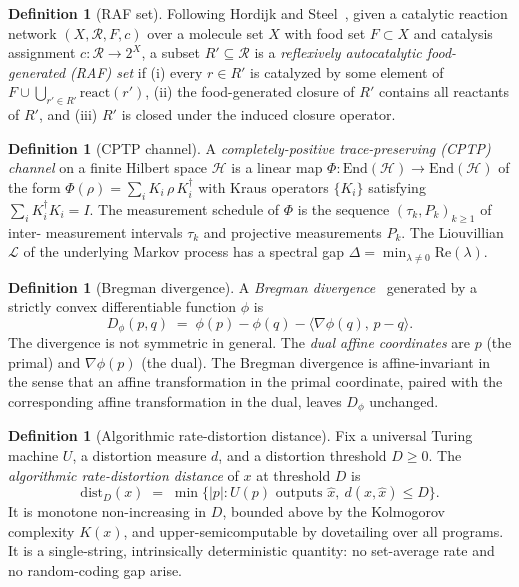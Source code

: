 \documentclass[11pt,a4paper]{article}
\theoremstyle{plain}
\theoremstyle{definition}
\newtheorem{definition}[theorem]{Definition}
\theoremstyle{remark}
\newcommand{\HH}{\mathcal{H}}
\newcommand{\End}{\mathrm{End}}
\newcommand{\distD}{\mathrm{dist}_{D}}
\begin{document}
\begin{definition}[RAF set]
\label{def:raf}
Following Hordijk and Steel~\cite{steel2004,hordijk2011}, given a
catalytic reaction network $(X, \mathcal{R}, F, c)$ over a molecule set
$X$ with food set $F\subset X$ and catalysis assignment $c:\mathcal{R}
\to 2^X$, a subset $R'\subseteq\mathcal{R}$ is a \emph{reflexively
autocatalytic food-generated (RAF) set} if (i) every $r\in R'$ is
catalyzed by some element of $F\cup\bigcup_{r'\in R'}\mathrm{react}(r')$,
(ii) the food-generated closure of $R'$ contains all reactants of $R'$,
and (iii) $R'$ is closed under the induced closure operator.
\end{definition}

\begin{definition}[CPTP channel]
\label{def:cptp}
A \emph{completely-positive trace-preserving (CPTP) channel} on a finite
Hilbert space $\HH$ is a linear map $\Phi:\End(\HH)\to\End(\HH)$ of the
form $\Phi(\rho)=\sum_i K_i\,\rho\,K_i^\dagger$ with Kraus operators
$\{K_i\}$ satisfying $\sum_i K_i^\dagger K_i = I$. The measurement
schedule of $\Phi$ is the sequence $(\tau_k, P_k)_{k\geq 1}$ of inter-
measurement intervals $\tau_k$ and projective measurements $P_k$. The
Liouvillian $\mathcal{L}$ of the underlying Markov process has a spectral
gap $\Delta = \min_{\lambda\neq 0}\mathrm{Re}(\lambda)$.
\end{definition}

\begin{definition}[Bregman divergence]
\label{def:bregman}
A \emph{Bregman divergence}~\cite{bregman1967,amari2000} generated by
a strictly convex differentiable function $\phi$ is
\begin{equation}
  D_\phi(p,q) \;=\; \phi(p) - \phi(q) - \langle\nabla\phi(q),\, p-q\rangle.
\end{equation}
The divergence is not symmetric in general. The \emph{dual affine
coordinates} are $p$ (the primal) and $\nabla\phi(p)$ (the dual). The
Bregman divergence is affine-invariant in the sense that an affine
transformation in the primal coordinate, paired with the corresponding
affine transformation in the dual, leaves $D_\phi$ unchanged.
\end{definition}

\begin{definition}[Algorithmic rate-distortion distance]
\label{def:ard}
Fix a universal Turing machine $U$, a distortion measure $d$, and a
distortion threshold $D\geq 0$. The \emph{algorithmic rate-distortion
distance} of $x$ at threshold $D$ is
\begin{equation}\label{eq:distD-def}
  \distD(x) \;=\; \min\bigl\{|p| : U(p)\text{ outputs }\hat x,\
  d(x,\hat x)\leq D\bigr\}.
\end{equation}
It is monotone non-increasing in $D$, bounded above by the Kolmogorov
complexity $K(x)$, and upper-semicomputable by dovetailing over all
programs. It is a single-string, intrinsically deterministic
quantity: no set-average rate and no random-coding gap arise.
\end{definition}
\end{document}
